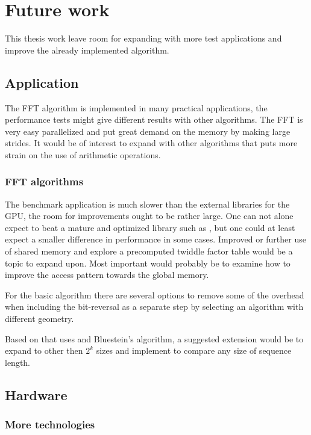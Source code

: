 \section{Future work}

This thesis work leave room for expanding with more test applications and improve the already implemented algorithm.

\subsection{Application}

The \gls{FFT} algorithm is implemented in many practical applications, the performance tests might give different results with other algorithms. The \gls{FFT} is very easy parallelized and put great demand on the memory by making large strides. It would be of interest to expand with other algorithms that puts more strain on the use of arithmetic operations.

\subsubsection{FFT algorithms}

The benchmark application is much slower than the external libraries for the \gls{GPU}, the room for improvements ought to be rather large. One can not alone expect to beat a mature and optimized library such as {\CUFFT}, but one could at least expect a smaller difference in performance in some cases. Improved or further use of shared memory and explore a precomputed twiddle factor table would be a topic to expand upon. Most important would probably be to examine how to improve the access pattern towards the global memory.

For the basic algorithm there are several options to remove some of the overhead when including the bit-reversal as a separate step by selecting an algorithm with different geometry.

Based on {\CUFFT} that uses {\CTALG} and Bluestein's algorithm, a suggested extension would be to expand to other then $2^{k}$ sizes and implement to compare any size of sequence length.

\subsection{Hardware}

\subsubsection{More technologies}

